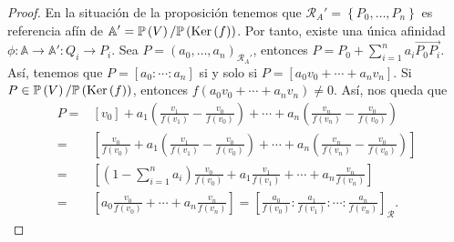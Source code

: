 \begin{proof}
	En la situación de la proposición tenemos que $\displaystyle \mathcal{R}_{A}' = \left\{ P_{0}, \ldots, P_{n}\right\}  $ es referencia afín de $\displaystyle \mathbb{A}'=\mathbb{P}\left(V\right) / \mathbb{P}\left(\operatorname{Ker}\left(f\right)\right) $. Por tanto, existe una única afinidad $\displaystyle \phi : \mathbb{A} \to \mathbb{A}':Q_{i} \to P_{i} $.  
	Sea $\displaystyle P = \left(a_{0}, \ldots, a_{n}\right)_{\mathcal{R}_{A}'} $, entonces $\displaystyle P = P_{0} + \sum^{n}_{ i=1}a_{i}\overrightarrow{P_{0}P_{i}} $.
	 Así, tenemos que $\displaystyle P = [a_{0} : \cdots : a_{n}] $ si y solo si $\displaystyle P = [a_{0}v_{0}+\cdots + a_{n}v_{n}] $. Si $\displaystyle P \in \mathbb{P}\left(V\right)/\mathbb{P}\left(\operatorname{Ker}\left(f\right)\right) $, entonces $\displaystyle f\left(a_{0}v_{0} + \cdots + a_{n}v_{n}\right) \neq 0 $. Así, nos queda que
	\[
	\begin{split}
		P = & [v_{0}] + a_{1}\left(\frac{v_{1}}{f\left(v_{1}\right)}-\frac{v_{0}}{f\left(v_{0}\right)}\right) + \cdots + a_{n}\left(\frac{v_{n}}{f\left(v_{n}\right)}-\frac{v_{0}}{f\left(v_{0}\right)}\right) \\
		= & \left[\frac{v_{0}}{f\left(v_{0}\right)}+a_{1}\left(\frac{v_{1}}{f\left(v_{1}\right)}-\frac{v_{0}}{f\left(v_{0}\right)}\right) + \cdots + a_{n}\left(\frac{v_{n}}{f\left(v_{n}\right)}-\frac{v_{0}}{f\left(v_{0}\right)}\right)\right] \\
		= & \left[\left(1-\sum^{n}_{i = 1}a_{i}\right)\frac{v_{0}}{f\left(v_{0}\right)} + a_{1}\frac{v_{1}}{f\left(v_{1}\right)} + \cdots +a_{n}\frac{v_{n}}{f\left(v_{n}\right)}\right] \\
		= & \left[a_{0}\frac{v_{0}}{f\left(v_{0}\right)} + \cdots + a_{n}\frac{v_{n}}{f\left(v_{n}\right)}\right] = \left[\frac{a_{0}}{f\left(v_{0}\right)}: \frac{a_{1}}{f\left(v_{1}\right)}: \cdots : \frac{a_{n}}{f\left(v_{n}\right)}\right] _{\mathcal{R}}  .
	\end{split}
	\]
\end{proof}
